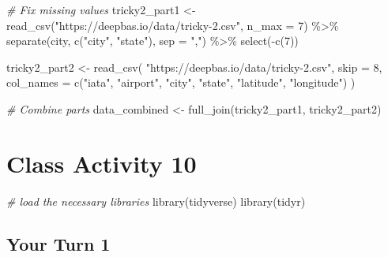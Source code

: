 \documentclass[
]{book}
\newenvironment{Shaded}{\begin{snugshade}}{\end{snugshade}}
\newcommand{\AttributeTok}[1]{\textcolor[rgb]{0.77,0.63,0.00}{#1}}
\newcommand{\CommentTok}[1]{\textcolor[rgb]{0.56,0.35,0.01}{\textit{#1}}}
\newcommand{\DecValTok}[1]{\textcolor[rgb]{0.00,0.00,0.81}{#1}}
\newcommand{\FunctionTok}[1]{\textcolor[rgb]{0.00,0.00,0.00}{#1}}
\newcommand{\NormalTok}[1]{#1}
\newcommand{\OtherTok}[1]{\textcolor[rgb]{0.56,0.35,0.01}{#1}}
\newcommand{\SpecialCharTok}[1]{\textcolor[rgb]{0.00,0.00,0.00}{#1}}
\newcommand{\StringTok}[1]{\textcolor[rgb]{0.31,0.60,0.02}{#1}}
\begin{document}
\begin{Shaded}
\begin{Highlighting}[]
\CommentTok{\# Fix missing values}
\NormalTok{tricky2\_part1 }\OtherTok{\textless{}{-}} \FunctionTok{read\_csv}\NormalTok{(}\StringTok{"https://deepbas.io/data/tricky{-}2.csv"}\NormalTok{, }\AttributeTok{n\_max =} \DecValTok{7}\NormalTok{) }\SpecialCharTok{\%\textgreater{}\%}
  \FunctionTok{separate}\NormalTok{(city, }\FunctionTok{c}\NormalTok{(}\StringTok{"city"}\NormalTok{, }\StringTok{"state"}\NormalTok{), }\AttributeTok{sep =} \StringTok{","}\NormalTok{) }\SpecialCharTok{\%\textgreater{}\%}
  \FunctionTok{select}\NormalTok{(}\SpecialCharTok{{-}}\FunctionTok{c}\NormalTok{(}\DecValTok{7}\NormalTok{))}

\NormalTok{tricky2\_part2 }\OtherTok{\textless{}{-}} \FunctionTok{read\_csv}\NormalTok{(}
  \StringTok{"https://deepbas.io/data/tricky{-}2.csv"}\NormalTok{,}
  \AttributeTok{skip =} \DecValTok{8}\NormalTok{, }
  \AttributeTok{col\_names =} \FunctionTok{c}\NormalTok{(}\StringTok{"iata"}\NormalTok{, }\StringTok{"airport"}\NormalTok{, }\StringTok{"city"}\NormalTok{, }\StringTok{"state"}\NormalTok{,  }\StringTok{"latitude"}\NormalTok{, }\StringTok{"longitude"}\NormalTok{)}
\NormalTok{)}

\CommentTok{\# Combine parts}
\NormalTok{data\_combined }\OtherTok{\textless{}{-}} \FunctionTok{full\_join}\NormalTok{(tricky2\_part1, tricky2\_part2)}
\end{Highlighting}
\end{Shaded}

\hypertarget{class-activity-10}{%
\chapter{Class Activity 10}\label{class-activity-10}}

\begin{Shaded}
\begin{Highlighting}[]
\CommentTok{\# load the necessary libraries}
\FunctionTok{library}\NormalTok{(tidyverse)}
\FunctionTok{library}\NormalTok{(tidyr)}
\end{Highlighting}
\end{Shaded}

\hypertarget{your-turn-1-3}{%
\section{Your Turn 1}\label{your-turn-1-3}}
\end{document}
